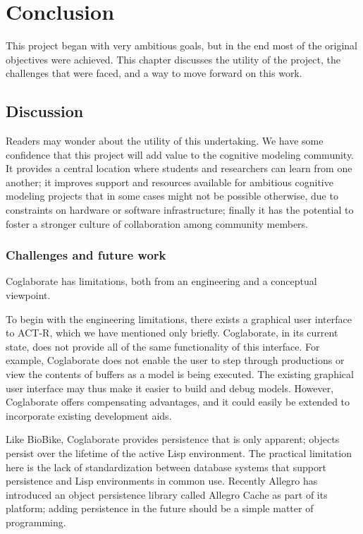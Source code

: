 \chapter{Conclusion}
\label{chap-seven}

This project began with very ambitious goals, but in the end most of
the original objectives were achieved.  This chapter discusses the
utility of the project, the challenges that were faced, and a way
to move forward on this work.

\section{Discussion}

Readers may wonder about the utility of this undertaking. We have some
confidence that this project will add value to the cognitive modeling
community. It provides a central location where students and
researchers can learn from one another; it improves support and
resources available for ambitious cognitive modeling projects that in
some cases might not be possible otherwise, due to constraints on
hardware or software infrastructure; finally it has the potential to
foster a stronger culture of collaboration among community members.

\subsection{Challenges and future work}


Coglaborate has limitations, both from an engineering and a conceptual
viewpoint.

To begin with the engineering limitations,
%
there exists a graphical user interface to ACT-R, which we have
mentioned only briefly.  Coglaborate, in its current state, does not
provide all of the same functionality of this interface.  For example,
Coglaborate does not enable the user to step through productions or
view the contents of buffers as a model is being executed.  The
existing graphical user interface may thus make it easier to build and
debug models.  However, Coglaborate offers compensating advantages,
and it could easily be extended to incorporate existing development
aids.

Like BioBike, Coglaborate provides persistence that is only apparent;
objects persist over the lifetime of the active Lisp environment.  The
practical limitation here is the lack of standardization between
database systems that support persistence and Lisp environments in
common use.  Recently Allegro has introduced an object persistence
library called Allegro Cache as part of its platform; adding
persistence in the future should be a simple matter of programming.

